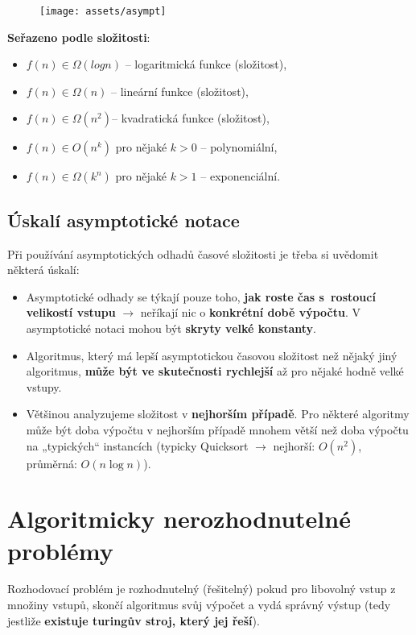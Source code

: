 \begin{minipage}{0.4\textwidth}
    \begin{figure}[H]
        \centering
        \texttt{[image: assets/asympt]}
    \end{figure}
\end{minipage}
\begin{minipage}{0.6\textwidth}
    \textbf{Seřazeno podle složitosti}:
    \small
    \begin{itemize}
        \item $f(n) \in \Omega(log n)$ -- logaritmická funkce (složitost),
        \item $f(n) \in \Omega(n)$ -- lineární funkce (složitost),
        \item $f(n) \in \Omega(n^2)$-- kvadratická funkce (složitost),
        \item $f(n) \in O(n^k)$ pro nějaké $k > 0$ -- polynomiální,
        \item $f(n) \in \Omega(k^n)$ pro nějaké $k > 1$ -- exponenciální.
    \end{itemize}
\end{minipage}

\subsection{Úskalí asymptotické notace}
Při používání asymptotických odhadů časové složitosti je třeba si uvědomit některá úskalí:
\begin{itemize}
    \item Asymptotické odhady se týkají pouze toho,\textbf{ jak roste čas s rostoucí velikostí vstupu} $\rightarrow$ neříkají nic o \textbf{konkrétní době výpočtu}. V asymptotické notaci mohou být \textbf{skryty velké konstanty}.
    \item Algoritmus, který má lepší asymptotickou časovou složitost než nějaký jiný algoritmus, \textbf{může být ve skutečnosti rychlejší} až pro nějaké hodně velké vstupy.
    \item Většinou analyzujeme složitost v \textbf{nejhorším případě}. Pro některé algoritmy může být doba výpočtu v nejhorším případě mnohem větší než doba výpočtu na „typických“ instancích (typicky Quicksort $\rightarrow$ nejhorší: $O(n^2)$, průměrná: $O(n \log n)$).
\end{itemize}

\section{Algoritmicky nerozhodnutelné problémy}
Rozhodovací problém je rozhodnutelný (řešitelný) pokud pro libovolný vstup z množiny vstupů, skončí algoritmus svůj výpočet a vydá správný výstup (tedy jestliže \textbf{existuje turingův stroj, který jej řeší}).

